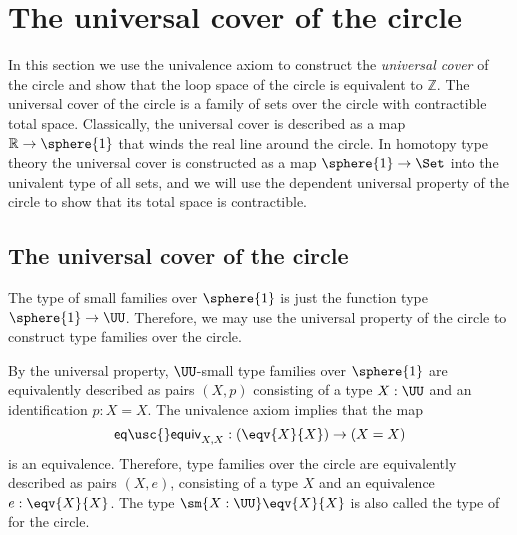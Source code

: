 \section{The universal cover of the circle}\label{sec:circle-universal-cover}

In this section we use the univalence axiom to construct the \emph{universal cover} of the circle and show that the loop space of the circle is equivalent to $\mathbb{Z}$. The universal cover of the circle is a family of sets over the circle with contractible total space.
Classically, the universal cover is described as a map $\mathbb{R}\to\sphere{1}$ that winds the real line around the circle. In homotopy type theory the universal cover is constructed as a map $\sphere{1}\to\Set$ into the univalent type of all sets, and we will use the dependent universal property of the circle to show that its total space is contractible.

\subsection{The universal cover of the circle}

The type of small families over $\sphere{1}$ is just the function type $\sphere{1}\to\UU$. Therefore, we may use the universal property of the circle to construct type families over the circle.

By the universal property, $\UU$-small type families over $\sphere{1}$ are equivalently described as pairs $(X,p)$ consisting of a type $X:\UU$ and an identification $p:X=X$. The univalence axiom implies that the map
\begin{equation*}
\mathsf{eq\usc{}equiv}_{X,X}:(\eqv{X}{X})\to (X=X)
\end{equation*}
is an equivalence. Therefore, type families over the circle are equivalently described as pairs $(X,e)$, consisting of a type $X$ and an equivalence $e:\eqv{X}{X}$. The type $\sm{X:\UU}\eqv{X}{X}$ is also called the type of  for the circle.

